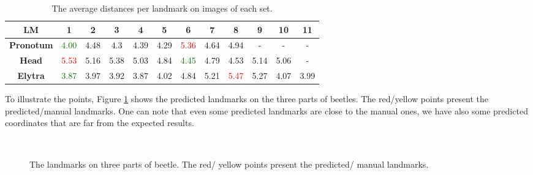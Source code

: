 \documentclass[review]{elsarticle}
\begin{document}
\begin{table}[h!]
	\centering	
	\begin{tabular}{|c|c|c|c|c|c|c|c|c|c|c|c|}
		\hline
		\textbf{LM} & 1 & 2 & 3 & 4 & 5 & 6 & 7 & 8 & 9 & 10 & 11 \\ \hline
		\textbf{Pronotum} & \textcolor{green}{4.00} & 4.48 & 4.3 & 4.39 & 4.29 & \textcolor{red}{5.36} & 4.64 & 4.94 & - & - & - \\ \hline
		\textbf{Head} & \textcolor{red}{5.53} & 5.16 & 5.38 & 5.03 & 4.84 & \textcolor{green}{4.45} & 4.79 & 4.53 & 5.14 & 5.06 & - \\ \hline
		\textbf{Elytra} & \textcolor{green}{3.87} & 3.97 & 3.92 & 3.87 & 4.02 & 4.84 & 5.21 & \textcolor{red}{5.47} & 5.27 & 4.07 & 3.99 \\ \hline
	\end{tabular}
	\caption{The average distances per landmark on images of each set.}
	\label{tblavgpronotum}
\end{table}

To illustrate the points, Figure \ref{figeb1} shows the predicted landmarks on the three parts of beetles. The red/yellow points present the predicted/manual landmarks. One can note that even some predicted landmarks are close to the manual ones, we have also some predicted coordinates that are far from the expected results.

\begin{figure}[h!]
	\centering
    ~~
	~~
    \caption{The landmarks on three parts of beetle. The red/ yellow points present the predicted/ manual landmarks.}
    \label{figeb1}
\end{figure}
\end{document}

